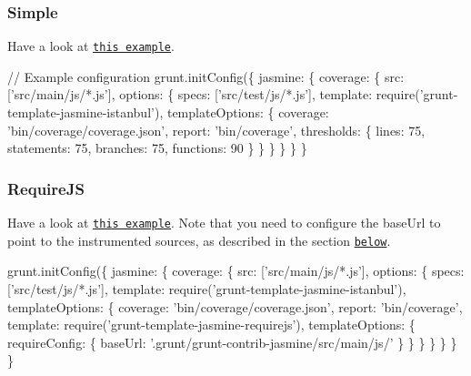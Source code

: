 \subsubsection*{Simple}

Have a look at \href{https://github.com/maenu/grunt-template-jasmine-istanbul-example}{\tt this example}.


\begin{DoxyCode}
\textcolor{comment}{// Example configuration}
grunt.initConfig(\{
    jasmine: \{
        coverage: \{
            src: [\textcolor{stringliteral}{'src/main/js/*.js'}],
            options: \{
                specs: [\textcolor{stringliteral}{'src/test/js/*.js'}],
                \textcolor{keyword}{template}: require(\textcolor{stringliteral}{'grunt-template-jasmine-istanbul'}),
                templateOptions: \{
                    coverage: \textcolor{stringliteral}{'bin/coverage/coverage.json'},
                    report: \textcolor{stringliteral}{'bin/coverage'},
                    thresholds: \{
                        lines: 75,
                        statements: 75,
                        branches: 75,
                        functions: 90
                    \}
                \}
            \}
        \}
    \}
\}
\end{DoxyCode}


\subsubsection*{Require\+J\+S}

Have a look at \href{https://github.com/maenu/grunt-template-jasmine-istanbul-example/tree/requirejs}{\tt this example}. Note that you need to configure the {\ttfamily base\+Url} to point to the instrumented sources, as described in the section \href{https://github.com/maenu/grunt-template-jasmine-istanbul#a-single-arequirement}{\tt below}.


\begin{DoxyCode}
grunt.initConfig(\{
    jasmine: \{
        coverage: \{
            src: [\textcolor{stringliteral}{'src/main/js/*.js'}],
            options: \{
                specs: [\textcolor{stringliteral}{'src/test/js/*.js'}],
                \textcolor{keyword}{template}: require(\textcolor{stringliteral}{'grunt-template-jasmine-istanbul'}),
                templateOptions: \{
                    coverage: \textcolor{stringliteral}{'bin/coverage/coverage.json'},
                    report: \textcolor{stringliteral}{'bin/coverage'},
                    \textcolor{keyword}{template}: require(\textcolor{stringliteral}{'grunt-template-jasmine-requirejs'}),
                    templateOptions: \{
                        requireConfig: \{
                            baseUrl: \textcolor{stringliteral}{'.grunt/grunt-contrib-jasmine/src/main/js/'}
                        \}
                    \}
                \}
            \}
        \}
    \}
\}
\end{DoxyCode}



